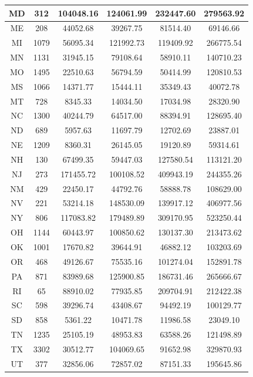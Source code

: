 \documentclass[
  english,
  man]{apa6}
\begin{document}
\begin{table}
\begin{tabular}[t]{c|c|c|c|c|c}
\hline
MD & 312 & 104048.16 & 124061.99 & 232447.60 & 279563.92\\
\hline
ME & 208 & 44052.68 & 39267.75 & 81514.40 & 69146.66\\
\hline
MI & 1079 & 56095.34 & 121992.73 & 119409.92 & 266775.54\\
\hline
MN & 1131 & 31945.15 & 79108.64 & 58910.11 & 140710.23\\
\hline
MO & 1495 & 22510.63 & 56794.59 & 50414.99 & 120810.53\\
\hline
MS & 1066 & 14371.77 & 15444.11 & 35349.43 & 40072.78\\
\hline
MT & 728 & 8345.33 & 14034.50 & 17034.98 & 28320.90\\
\hline
NC & 1300 & 40244.79 & 64517.00 & 88394.91 & 128695.40\\
\hline
ND & 689 & 5957.63 & 11697.79 & 12702.69 & 23887.01\\
\hline
NE & 1209 & 8360.31 & 26145.05 & 19120.89 & 59314.61\\
\hline
NH & 130 & 67499.35 & 59447.03 & 127580.54 & 113121.20\\
\hline
NJ & 273 & 171455.72 & 100108.52 & 409943.19 & 244355.26\\
\hline
NM & 429 & 22450.17 & 44792.76 & 58888.78 & 108629.00\\
\hline
NV & 221 & 53214.18 & 148530.09 & 139917.12 & 406977.56\\
\hline
NY & 806 & 117083.82 & 179489.89 & 309170.95 & 523250.44\\
\hline
OH & 1144 & 60443.97 & 100850.62 & 130137.30 & 213473.62\\
\hline
OK & 1001 & 17670.82 & 39644.91 & 46882.12 & 103203.69\\
\hline
OR & 468 & 49126.67 & 75535.16 & 101274.04 & 152891.78\\
\hline
PA & 871 & 83989.68 & 125900.85 & 186731.46 & 265666.67\\
\hline
RI & 65 & 88910.02 & 77935.85 & 209704.91 & 212422.38\\
\hline
SC & 598 & 39296.74 & 43408.67 & 94492.19 & 100129.77\\
\hline
SD & 858 & 5361.22 & 10471.78 & 11986.58 & 23049.10\\
\hline
TN & 1235 & 25105.19 & 48953.83 & 63588.26 & 121498.89\\
\hline
TX & 3302 & 30512.77 & 104069.65 & 91652.98 & 329870.93\\
\hline
UT & 377 & 32856.06 & 72857.02 & 87151.33 & 195645.86\\
\hline

\end{tabular}
\end{table}
\end{document}
